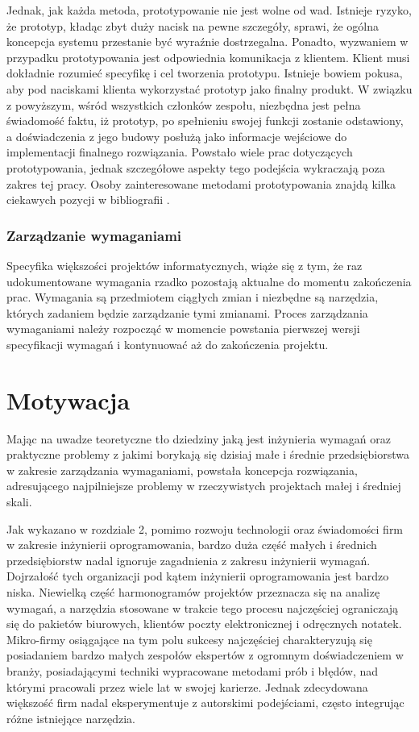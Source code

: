         Jednak, jak każda metoda, prototypowanie nie jest wolne od wad. Istnieje ryzyko, że prototyp, kładąc zbyt duży nacisk na pewne szczegóły, sprawi, że ogólna koncepcja systemu przestanie być wyraźnie dostrzegalna. Ponadto, wyzwaniem w przypadku prototypowania jest odpowiednia komunikacja z klientem. Klient musi dokładnie rozumieć specyfikę i cel tworzenia prototypu. Istnieje bowiem pokusa, aby pod naciskami klienta wykorzystać prototyp jako finalny produkt. W związku z powyższym, wśród wszystkich członków zespołu, niezbędna jest pełna świadomość faktu, iż prototyp, po spełnieniu swojej funkcji zostanie odstawiony, a doświadczenia z jego budowy posłużą jako informacje wejściowe do implementacji finalnego rozwiązania. Powstało wiele prac dotyczących prototypowania, jednak szczegółowe aspekty tego podejścia wykraczają poza zakres tej pracy. Osoby zainteresowane metodami prototypowania znajdą kilka ciekawych pozycji w bibliografii \cite{arnowitz2006effective, budde1992prototyping}.

      \subsubsection{Zarządzanie wymaganiami}

        Specyfika większości projektów informatycznych, wiąże się z tym, że raz udokumentowane wymagania rzadko pozostają aktualne do momentu zakończenia prac. Wymagania są przedmiotem ciągłych zmian i niezbędne są narzędzia, których zadaniem będzie zarządzanie tymi zmianami. Proces zarządzania wymaganiami należy rozpocząć w momencie powstania pierwszej wersji specyfikacji wymagań i kontynuować aż do zakończenia projektu.

  \section{Motywacja}

    Mając na uwadze teoretyczne tło dziedziny jaką jest inżynieria wymagań oraz praktyczne problemy z jakimi borykają się dzisiaj małe i średnie przedsiębiorstwa w zakresie zarządzania wymaganiami, powstała koncepcja rozwiązania, adresującego najpilniejsze problemy w rzeczywistych projektach małej i średniej skali. 

    Jak wykazano w rozdziale 2, pomimo rozwoju technologii oraz świadomości firm w zakresie inżynierii oprogramowania, bardzo duża część małych \linebreak i średnich przedsiębiorstw nadal ignoruje zagadnienia z zakresu inżynierii wymagań. Dojrzałość tych organizacji pod kątem inżynierii oprogramowania jest bardzo niska. Niewielką część harmonogramów projektów przeznacza się na analizę wymagań, a narzędzia stosowane w trakcie tego procesu najczęściej ograniczają się do pakietów biurowych, klientów poczty elektronicznej i odręcznych notatek. Mikro-firmy osiągające na tym polu sukcesy najczęściej charakteryzują się posiadaniem bardzo małych zespołów ekspertów z ogromnym doświadczeniem w branży, posiadającymi techniki wypracowane metodami prób i błędów, nad którymi pracowali przez wiele lat w swojej karierze.  Jednak zdecydowana większość firm nadal eksperymentuje z autorskimi podejściami, często integrując różne istniejące narzędzia. 
    
